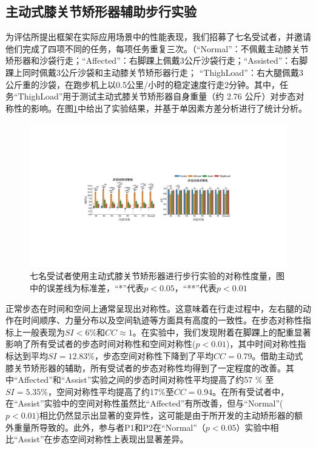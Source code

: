 \subsection{主动式膝关节矫形器辅助步行实验}
为评估所提出框架在实际应用场景中的性能表现，我们招募了七名受试者，并邀请他们完成了四项不同的任务，每项任务重复三次。（``Normal''：不佩戴主动膝关节矫形器和沙袋行走；``Affected''：右脚踝上佩戴3公斤沙袋行走；``Assisted''：右脚踝上同时佩戴3公斤沙袋和主动膝关节矫形器行走； ``ThighLoad''：右大腿佩戴3公斤重的沙袋，在跑步机上以0.5公里/小时的稳定速度行走2分钟。其中，任务``ThighLoad''用于测试主动式膝关节矫形器自身重量（约 2.76 公斤）对步态对称性的影响。在图\ref{fig:5-7}中给出了实验结果，并基于单因素方差分析进行了统计分析。
\begin{figure}[htb]
  \centering\includegraphics[width=1\textwidth]{figures/5-Fig-7.pdf}
  \caption{七名受试者使用主动式膝关节矫形器进行步行实验的对称性度量，图中的误差线为标准差，``*''代表$p \less 0.05$，``**''代表$p \less 0.01$}
  \label{fig:5-7}
\end{figure}

正常步态在时间和空间上通常呈现出对称性。这意味着在行走过程中，左右腿的动作在时间顺序、力量分布以及空间轨迹等方面具有高度的一致性。在步态对称性指标上一般表现为${SI < 6 \%}$和${CC}\approx {1}$\cite{balabanGaitDisturbancesPatients2014}。在实验中，我们发现附着在脚踝上的配重显著影响了所有受试者的步态时间对称性和空间对称性($p<0.01$)，其中时间对称性指标达到平均${SI}=12.83 \%$，步态空间对称性下降到了平均${CC} = 0.79$。借助主动式膝关节矫形器的辅助，所有受试者的步态对称性均得到了一定程度的改善。其中``Affected''和``Assist''实验之间的步态时间对称性平均提高了约57 \% 至${SI} = 5.35 \%$，空间对称性平均提高了约17\%至${CC} = 0.94$。在所有受试者中，在``Assist''实验中的空间对称性虽然比``Affected''有所改善，但与``Normal''($p<0.01$)相比仍然显示出显著的变异性，这可能是由于所开发的主动矫形器的额外重量所导致的。此外，参与者P1和P2在``Normal''（$p<0.05$）实验中相比``Assist''在步态空间对称性上表现出显著差异。

